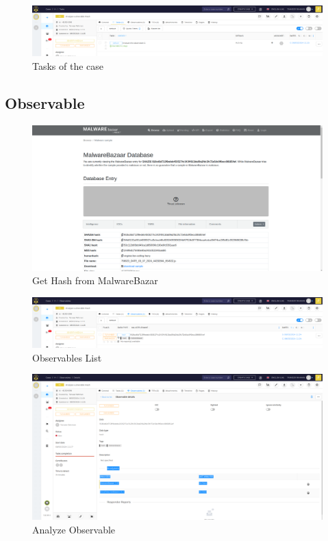 \documentclass{book}
\begin{document}
\begin{figure}[h]
    \centering
    \includegraphics[width=.7\linewidth]{Case_images/Case Demo/Task_page.png}
    \caption{Tasks of the case }
    \label{fig:task_page}
\end{figure}
\newpage
\subsection{Observable}
\begin{figure}[h]
    \centering
    \includegraphics[width=.7\linewidth]{Case_images/Case Demo/Malwarebazar.png}
    \caption{Get Hash from MalwareBazar}
    \label{fig:hash}
\end{figure}

\begin{figure}[h]
    \centering
    \includegraphics[width=.6\linewidth]{Case_images/Case Demo/observables.png}
    \caption{Observables List}
    \label{fig:observable_list}
\end{figure}

\begin{figure}[h]
    \centering
    \includegraphics[width=.7\linewidth]{Case_images/Case Demo/analyze_observable.png}
    \caption{Analyze Observable}
    \label{fig:analyze_observable}
\end{figure}
\end{document}

